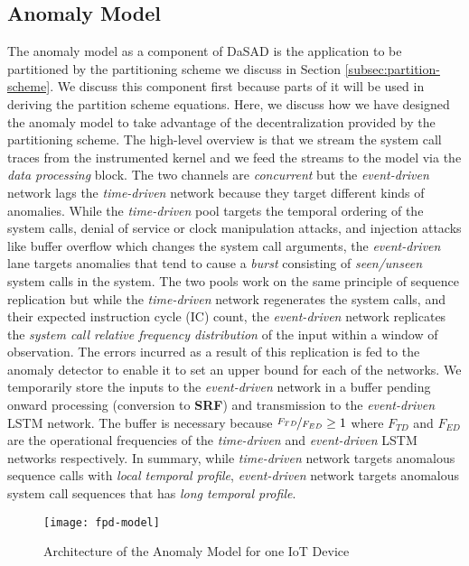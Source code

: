\subsection{Anomaly Model}
\label{subsec:anom-model}
The anomaly model as a component of DaSAD is the application to be partitioned 
by the partitioning scheme we discuss in Section \ref{subsec:partition-scheme}. 
We discuss this component first because parts of it will be used in deriving 
the partition scheme equations. Here, we discuss how we have designed the 
anomaly model to take advantage of the decentralization provided by the 
partitioning scheme. The high-level 
overview is that we stream the system call traces from the instrumented kernel 
and we feed the streams to the model via the \emph{data processing} block. The 
two 
channels are \emph{concurrent} but the \emph{event-driven} network lags the 
\emph{time-driven} network because they target different kinds of anomalies. 
While the \emph{time-driven} pool targets the temporal ordering of the system 
calls, denial of service or clock manipulation attacks, and injection attacks 
like 
buffer overflow which changes the system call arguments, the 
\emph{event-driven} 
lane targets anomalies that tend to cause a \emph{burst} consisting of 
\emph{seen/unseen} system calls in the system. The two pools work on the same 
principle of sequence replication but while the \emph{time-driven} network 
regenerates the 
system calls, and their expected instruction cycle (IC) count, the 
\emph{event-driven} network replicates the \emph{system call relative frequency 
distribution} of the input within a window of observation. 
The errors incurred as a result of this replication is fed to the anomaly 
detector to enable it to set an upper 
bound for each of the networks. We temporarily store the inputs to the 
\emph{event-driven} network in a buffer 
pending onward processing (conversion to \textbf{SRF}) and transmission to the 
\emph{event-driven} LSTM network. The buffer is 
necessary because $ \nicefrac{F_{TD}}{F_{ED}} \geq 1 $ 
where 
$ F_{TD} $ and $ F_{ED} $ are the operational frequencies of the 
\emph{time-driven} and \emph{event-driven} LSTM networks respectively. In 
summary, 
while \emph{time-driven} network targets anomalous sequence calls with 
\emph{local 
	temporal profile}, \emph{event-driven} network targets anomalous system 
	call 
sequences that has \emph{long temporal profile}. 

\begin{figure*}[!t]
	\centering
	\texttt{[image: fpd-model]} 
	\caption{Architecture of the Anomaly Model for one IoT Device}
	\label{fig:model-architecture}
\end{figure*} 

